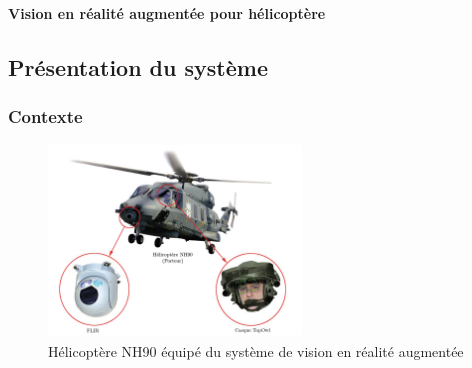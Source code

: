 \begin{huge}
\textbf{Vision en réalité augmentée pour hélicoptère}
\end{huge}
\vspace{-.5cm}
\subsection{Présentation du système}
\vspace{-.5cm}
\subsubsection{Contexte}
\begin{figure}[!htb]
\begin{center}
\includegraphics[width=0.6\textwidth]{images/figure1.jpg}
\caption{Hélicoptère NH90 équipé du système de vision en réalité augmentée\label{fig1}}
\end{center}
\end{figure}

